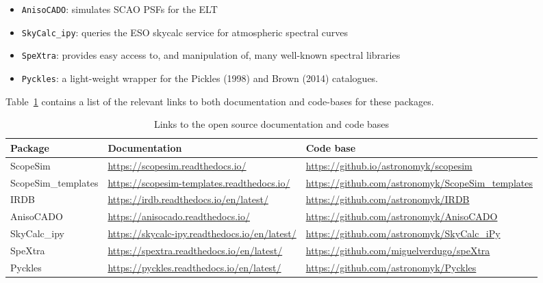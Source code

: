 \begin{itemize}
\item \lstinline{AnisoCADO}: simulates SCAO PSFs for the ELT

\item \lstinline{SkyCalc_ipy}: queries the ESO skycalc service for
  atmospheric spectral curves

\item \lstinline{SpeXtra}: provides easy access to, and manipulation
  of, many well-known spectral libraries

\item \lstinline{Pyckles}: a light-weight wrapper for the Pickles
  (1998)\cite{pickles1998} and Brown (2014)\cite{brown2014}
  catalogues.
\end{itemize}


Table~\ref{tbl-list-of-packages} contains a list of the relevant links
to both documentation and code-bases for these packages.

\begin{table}
  \caption{Links to the open source documentation and code bases}
  \label{tbl-list-of-packages}
  \begin{tabularx}{\linewidth}{|l|X|X|}
    \hline

    Package
    &
    Documentation
    &
    Code base
    \\
    \hline\hline

    ScopeSim
    &
    \url{https://scopesim.readthedocs.io/}
    &
    \url{https://github.io/astronomyk/scopesim}
    \\
    \hline

    ScopeSim\_templates
    &
    \url{https://scopesim-templates.readthedocs.io/}
    &
    \url{https://github.com/astronomyk/ScopeSim_templates}
    \\
    \hline

    IRDB
    &
    \url{https://irdb.readthedocs.io/en/latest/}
    &
    \url{https://github.com/astronomyk/IRDB}
    \\
    \hline

    AnisoCADO
    &
    \url{https://anisocado.readthedocs.io/}
    &
    \url{https://github.com/astronomyk/AnisoCADO}
    \\
    \hline

    SkyCalc\_ipy
    &
    \url{https://skycalc-ipy.readthedocs.io/en/latest/}
    &
    \url{https://github.com/astronomyk/SkyCalc_iPy}
    \\
    \hline

    SpeXtra
    &
    \url{https://spextra.readthedocs.io/en/latest/}
    &
    \url{https://github.com/miguelverdugo/speXtra}
    \\
    \hline

    Pyckles
    &
    \url{https://pyckles.readthedocs.io/en/latest/}
    &
    \url{https://github.com/astronomyk/Pyckles}
    \\
    \hline
  \end{tabularx}
\end{table}

